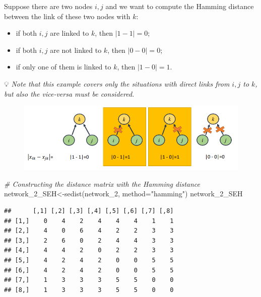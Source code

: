 \documentclass[
  notitlepage,
  onecolumn,
  openany]{book}
\newenvironment{Shaded}{\begin{snugshade}}{\end{snugshade}}
\newcommand{\AttributeTok}[1]{\textcolor[rgb]{0.77,0.63,0.00}{#1}}
\newcommand{\CommentTok}[1]{\textcolor[rgb]{0.56,0.35,0.01}{\textit{#1}}}
\newcommand{\FunctionTok}[1]{\textcolor[rgb]{0.00,0.00,0.00}{#1}}
\newcommand{\NormalTok}[1]{#1}
\newcommand{\OtherTok}[1]{\textcolor[rgb]{0.56,0.35,0.01}{#1}}
\newcommand{\StringTok}[1]{\textcolor[rgb]{0.31,0.60,0.02}{#1}}
\providecommand{\tightlist}{%
  \setlength{\itemsep}{0pt}\setlength{\parskip}{0pt}}
\begin{document}
Suppose there are two nodes \(i,j\) and we want to compute the Hamming distance between the link of these two nodes with \(k\):

\begin{itemize}
\tightlist
\item
  if both \(i,j\) are linked to \(k\), then \(|1-1| = 0\);
\item
  if both \(i,j\) are not linked to \(k\), then \(|0-0| = 0\);
\item
  if only one of them is linked to \(k\), then \(|1-0| = 1\).
\end{itemize}

💡 \emph{Note that this example covers only the situations with direct links from \(i,j\) to \(k\), but also the vice-versa must be considered.}

\begin{figure}[h!]

{\centering \includegraphics[width=0.5\linewidth]{images/11-Subgroups and Structural Equivalence/Untitled 6} 

}

\end{figure}

\begin{Shaded}
\begin{Highlighting}[]
\CommentTok{\# Constructing the distance matrix with the Hamming distance}
\NormalTok{network\_2\_SEH}\OtherTok{\textless{}{-}}\FunctionTok{sedist}\NormalTok{(network\_2, }\AttributeTok{method=}\StringTok{"hamming"}\NormalTok{)}
\NormalTok{network\_2\_SEH }
\end{Highlighting}
\end{Shaded}

\begin{verbatim}
##      [,1] [,2] [,3] [,4] [,5] [,6] [,7] [,8]
## [1,]    0    4    2    4    4    4    1    1
## [2,]    4    0    6    4    2    2    3    3
## [3,]    2    6    0    2    4    4    3    3
## [4,]    4    4    2    0    2    2    3    3
## [5,]    4    2    4    2    0    0    5    5
## [6,]    4    2    4    2    0    0    5    5
## [7,]    1    3    3    3    5    5    0    0
## [8,]    1    3    3    3    5    5    0    0
\end{verbatim}
\end{document}
